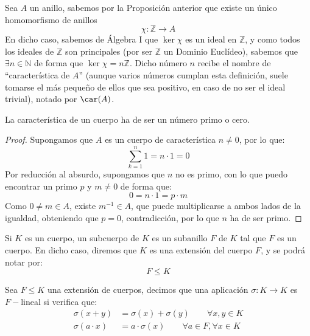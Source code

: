 \begin{definicion}
    Sea $A$ un anillo, sabemos por la Proposición anterior que existe un único homomorfismo de anillos 
    \begin{equation*}
        \chi:\mathbb{Z}\to A
    \end{equation*}
    En dicho caso, sabemos de Álgebra I que $\ker\chi$ es un ideal en $\mathbb{Z}$, y como todos los ideales de $\mathbb{Z}$ son principales (por ser $\mathbb{Z}$ un Dominio Euclídeo), sabemos que $\exists n\in \mathbb{N}$ de forma que $\ker\chi = n\mathbb{Z}$. Dicho número $n$ recibe el nombre de ``característica de $A$'' (aunque varios números cumplan esta definición, suele tomarse el más pequeño de ellos que sea positivo, en caso de no ser el ideal trivial), notado por $\car(A)$.
\end{definicion}

\begin{prop}
    La característica de un cuerpo ha de ser un número primo o cero.
    \begin{proof}
        Supongamos que $A$ es un cuerpo de característica $n\neq 0$, por lo que:
        \begin{equation*}
            \sum_{k=1}^{n}1 = n\cdot 1 = 0
        \end{equation*}
        Por reducción al absurdo, supongamos que $n$ no es primo, con lo que puedo encontrar un primo $p$ y $m\neq 0$ de forma que:
        \begin{equation*}
            0 = n\cdot 1 = p\cdot m
        \end{equation*}
        Como $0\neq m \in A$, existe $m^{-1}\in A$, que puede multiplicarse a ambos lados de la igualdad, obteniendo que $p = 0$, contradicción, por lo que $n$ ha de ser primo.
    \end{proof}
\end{prop}

\begin{definicion}
    Si $K$ es un cuerpo, un subcuerpo de $K$ es un subanillo $F$ de $K$ tal que $F$ es un cuerpo. En dicho caso, diremos que $K$ es una extensión del cuerpo $F$, y se podrá notar por:
    \begin{equation*}
        F\leq K
    \end{equation*}
\end{definicion}

\begin{definicion}
    Sea $F\leq K$ una extensión de cuerpos, decimos que una aplicación $\sigma:K\to K$ es $F-$lineal si verifica que:
    \begin{align*}
        \sigma(x+y) &= \sigma(x) + \sigma(y) \qquad \forall x,y\in K \\
        \sigma(a\cdot x) &= a\cdot \sigma(x) \qquad \forall a\in F, \forall x\in K
    \end{align*}
\end{definicion}

